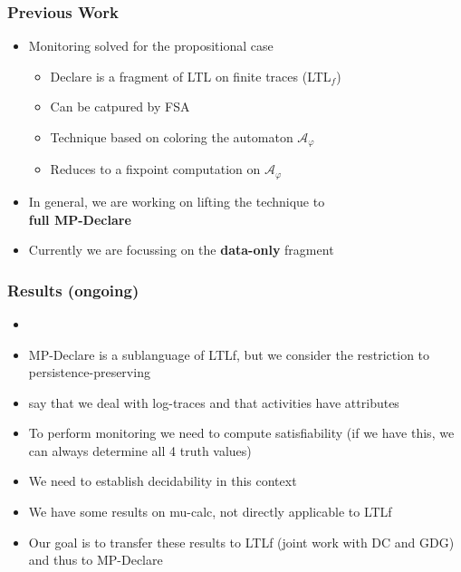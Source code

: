 \documentclass{beamer}
\newcommand{\A}{\mathcal A}
\begin{document}
\begin{frame}
\frametitle{Previous Work}

\begin{itemize}
	\item Monitoring solved for the propositional case~\cite{}
	\begin{itemize}
		\item Declare is a fragment of LTL on finite traces (LTL$_f$)
		\item Can be catpured by FSA
		\item Technique based on coloring the automaton $\A_\varphi$
		\item Reduces to a fixpoint computation on $\A_\varphi$
	\end{itemize}
\end{itemize}

\begin{itemize}
	\item In general, we are working on lifting the technique to\\ {\bf full MP-Declare}
	\item Currently we are focussing on the {\bf data-only} fragment
\end{itemize}

\end{frame}


\begin{frame}
\frametitle{Results (ongoing)}

\begin{itemize}	
	\item 
\end{itemize}


\begin{itemize}	
	\item MP-Declare is a sublanguage of LTLf, but we consider the restriction to persistence-preserving
	\item say that we deal with log-traces and that activities have attributes
	\item To perform monitoring we need to compute satisfiability (if we have this, we can always determine all 4 truth values)
	\item We need to establish decidability in this context
	\item We have some results on mu-calc, not directly applicable to LTLf
	\item Our goal is to transfer these results to LTLf (joint work with DC and GDG) 
		and thus to MP-Declare
\end{itemize}

\end{frame}
\end{document}
